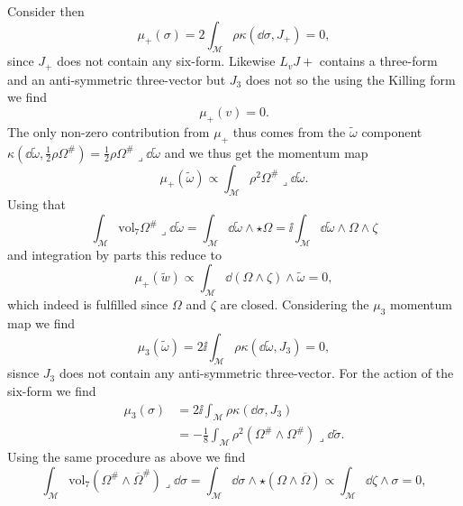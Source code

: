 Consider then
\begin{equation}
    \mu_+(\sigma) = 2\int_\mathcal{M}\rho\kappa(\dd\sigma,J_+) = 0,
\end{equation}
since $J_+$ does not contain any six-form. Likewise $L_vJ+$ contains a three-form and an anti-symmetric three-vector but $J_3$ does not so the using the Killing form we find 
\begin{equation}
    \mu_+(v) = 0.
\end{equation}
The only non-zero contribution from $\mu_+$ thus comes from the $\tilde{\omega}$ component $\kappa(\dd\tilde{\omega},\frac{1}{2}\rho\Omega^{\#})=\frac{1}{2}\rho\Omega^{\#}\lrcorner \dd\tilde{\omega}$ and we thus get the momentum map
\begin{equation}
    \mu_+(\tilde{\omega})\propto \int_\mathcal{M}\rho^2\Omega^{\#}\lrcorner \dd\tilde{\omega}.
\end{equation}
Using that 
\begin{equation}
\int_\mathcal{M}\text{vol}_7 \Omega^{\#}\lrcorner \dd\tilde{\omega} =  \int_\mathcal{M}\dd\tilde{\omega}\wedge \star\Omega=\ii\int_\mathcal{M}\dd\tilde{\omega}\wedge \Omega\wedge\zeta
\end{equation}
and integration by parts this reduce to 
\begin{equation}
    \mu_+(\tilde{w}) \propto \int_\mathcal{M}\dd(\Omega\wedge\zeta)\wedge\tilde{\omega} = 0,
\end{equation}
which indeed is fulfilled since $\Omega$ and $\zeta$ are closed. Considering the $\mu_3$ momentum map we find 
\begin{equation}
    \mu_3(\tilde{\omega}) = 2\ii\int_\mathcal{M}\rho\kappa(\dd\tilde{\omega},J_3) = 0,
\end{equation}
sisnce $J_3$ does not contain any anti-symmetric three-vector. For the action of the six-form we find 
\begin{equation}
    \begin{aligned}
    \mu_3(\sigma) &= 2\ii\int_\mathcal{M}\rho\kappa(\dd\sigma,J_3)\\
                  &=-\frac{1}{8}\int_\mathcal{M}\rho^2(\Omega^{\#}\wedge\Omega^{\#})\lrcorner \dd\tilde{\sigma}.
    \end{aligned}
\end{equation}
Using the same procedure as above we find
\begin{equation}
    \int_\mathcal{M}\text{vol}_7 (\Omega^{\#}\wedge \overbar{\Omega}^{\#})\lrcorner \dd\sigma = \int_\mathcal{M} \dd\sigma\wedge \star(\Omega\wedge\overbar{\Omega}) \propto \int_\mathcal{M} \dd \zeta\wedge \sigma = 0,
\end{equation}
